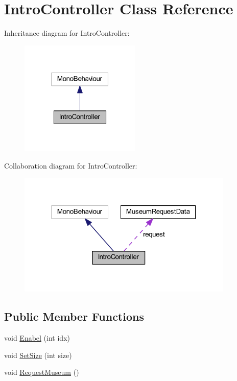 \hypertarget{class_intro_controller}{}\section{Intro\+Controller Class Reference}
\label{class_intro_controller}


Inheritance diagram for Intro\+Controller\+:
\nopagebreak
\begin{figure}[H]
\begin{center}
\leavevmode
\includegraphics[width=163pt]{class_intro_controller__inherit__graph}
\end{center}
\end{figure}


Collaboration diagram for Intro\+Controller\+:
\nopagebreak
\begin{figure}[H]
\begin{center}
\leavevmode
\includegraphics[width=292pt]{class_intro_controller__coll__graph}
\end{center}
\end{figure}
\subsection*{Public Member Functions}
\begin{DoxyCompactItemize}
\item 
void \mbox{\hyperlink{class_intro_controller_af189f110e2a1fc56f21c2e5d91af849f}{Enabel}} (int idx)
\item 
void \mbox{\hyperlink{class_intro_controller_a87be0da70dd6d5aee2808072978c2ff6}{Set\+Size}} (int size)
\item 
void \mbox{\hyperlink{class_intro_controller_afdc3da184119a836c16a44e5615bc2f9}{Request\+Museum}} ()
\end{DoxyCompactItemize}
